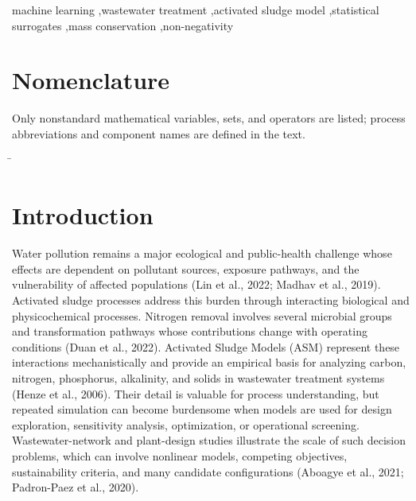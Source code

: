 \documentclass[a4paper,fleqn]{cas-sc}
\begin{document}
\begin{keywords}
machine learning \sep wastewater treatment \sep activated sludge model \sep statistical surrogates \sep mass conservation \sep non-negativity
\end{keywords}

\maketitle

\section*{Nomenclature}
\noindent Only nonstandard mathematical variables, sets, and operators are listed; process abbreviations and component names are defined in the text.
\begin{tabbing}
\hspace{4.4cm} \= \kill
{}
\end{tabbing}

\section{Introduction}

Water pollution remains a major ecological and public-health challenge whose effects are dependent on pollutant sources, exposure pathways, and the vulnerability of affected populations (Lin et al., 2022; Madhav et al., 2019). Activated sludge processes address this burden through interacting biological and physicochemical processes. Nitrogen removal involves several microbial groups and transformation pathways whose contributions change with operating conditions (Duan et al., 2022). Activated Sludge Models (ASM) represent these interactions mechanistically and provide an empirical basis for analyzing carbon, nitrogen, phosphorus, alkalinity, and solids in wastewater treatment systems (Henze et al., 2006). Their detail is valuable for process understanding, but repeated simulation can become burdensome when models are used for design exploration, sensitivity analysis, optimization, or operational screening. Wastewater-network and plant-design studies illustrate the scale of such decision problems, which can involve nonlinear models, competing objectives, sustainability criteria, and many candidate configurations (Aboagye et al., 2021; Padron-Paez et al., 2020).
\end{document}
